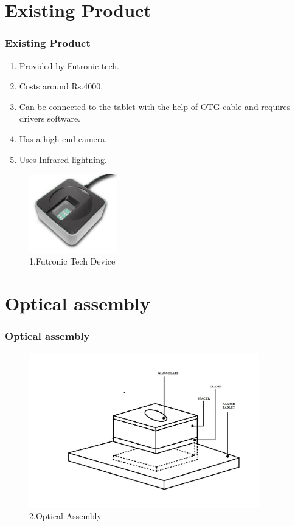 \documentclass[12pt]{beamer}
\begin{document}
\section{Existing Product}
\begin{frame}[c]
\frametitle{Existing Product}
\begin{enumerate}
\item Provided by Futronic tech.
\item Costs around Rs.4000.
\item Can be connected to the tablet with the help of OTG cable and requires drivers  software.
\item Has a high-end camera.
\item Uses Infrared lightning.
\end{enumerate}
\begin{figure}
 \centering
 \includegraphics[width=3.8cm]{./ft.jpg}
 \caption{1.Futronic Tech Device}
\end{figure}
 \end{frame}


\section{Optical assembly}
\begin{frame}[c]
\frametitle{Optical assembly}
\begin{figure}
 \centering
 \includegraphics[width=10cm]{./oa.jpg}
 \caption{2.Optical Assembly}
\end{figure}
\end{frame}
\end{document}
